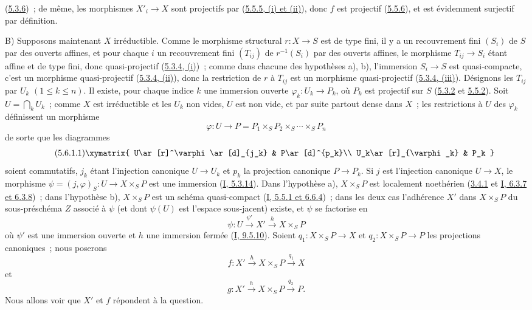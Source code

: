
(\hyperref[II.5.3.6-fr]{5.3.6})~; de même, les morphismes $X'_i\to X$ sont
projectifs par (\hyperref[II.5.5.5-fr]{5.5.5, (i) et (ii)}), donc $f$ est
projectif (\hyperref[II.5.5.6-fr]{5.5.6}), et est évidemment surjectif par
définition.

B) Supposons maintenant $X$ irréductible. Comme le morphisme structural
$r:X\to S$ est de type fini, il y a un recouvrement fini $(S_i)$ de $S$ par
des ouverts affines, et pour chaque $i$ un recouvrement fini $(T_{ij})$ de
$r^{-1}(S_i)$ par des ouverts affines, le morphisme $T_{ij}\to S_i$ étant
affine et de type fini, donc quasi-projectif
(\hyperref[II.5.3.4-fr]{5.3.4, (i)})~; comme dans chacune des hypothèses a),
b), l'immersion $S_i\to S$ est quasi-compacte, c'est un morphisme
quasi-projectif (\hyperref[II.5.3.4-fr]{5.3.4, (ii)}), donc la restriction de
$r$ à $T_{ij}$ est un morphisme quasi-projectif
(\hyperref[II.5.3.4-fr]{5.3.4, (iii)}). Désignons les $T_{ij}$ par $U_k$
$(1\leq k\leq n)$. Il existe, pour chaque indice $k$ une immersion ouverte
$\varphi_k:U_k\to P_k$, où $P_k$ est projectif sur $S$
(\hyperref[II.5.3.2-fr]{5.3.2} et \hyperref[II.5.5.2-fr]{5.5.2}). Soit
$U=\bigcap_kU_k$~; comme $X$ est irréductible et les $U_k$ non vides, $U$ est
non vide, et par suite partout dense dans $X$~; les restrictions à $U$ des
$\varphi_k$ définissent un morphisme
\[
\varphi:U\to P=P_1\times_SP_2\times_S\cdots\times_SP_n
\]
de sorte que les diagrammes
\[
\tag{5.6.1.1}
\label{II.5.6.1.1-fr}
\xymatrix{
U\ar[r]^\varphi\ar[d]_{j_k} & P\ar[d]^{p_k}\\
U_k\ar[r]_{\varphi_k} & P_k
}
\]
soient commutatifs, $j_k$ étant l'injection canonique $U\to U_k$ et $p_k$ la
projection canonique $P\to P_k$. Si $j$ est l'injection canonique $U\to X$,
le morphisme $\psi=(j,\varphi)_S:U\to X\times_SP$ est une immersion
(\hyperref[I.5.3.14-fr]{I, 5.3.14}). Dans l'hypothèse a), $X\times_SP$ est
localement noethérien (\hyperref[II.3.4.1-fr]{3.4.1} et
\hyperref[I.6.3.7-fr]{I, 6.3.7 et 6.3.8})~; dans l'hypothèse b),
$X\times_SP$ est un schéma quasi-compact
(\hyperref[I.5.5.1-fr]{I, 5.5.1 et 6.6.4})~; dans les deux cas l'adhérence
$X'$ dans $X\times_SP$ du sous-préschéma $Z$ associé à $\psi$ (et dont
$\psi(U)$ est l'espace sous-jacent) existe, et $\psi$ se factorise en
\[
\tag{5.6.1.2}
\label{II.5.6.1.2-fr}
\psi:U\xrightarrow{\psi'}X'\xrightarrow{h}X\times_SP
\]
où $\psi'$ est une immersion ouverte et $h$ une immersion fermée
(\hyperref[I.9.5.10-fr]{I, 9.5.10}). Soient
$q_1:X\times_SP\to X$ et $q_2:X\times_SP\to P$ les projections canoniques~;
nous poserons
\[
\tag{5.6.1.3}
\label{II.5.6.1.3-fr}
f:X'\xrightarrow{h}X\times_SP\xrightarrow{q_1}X
\]
et
\[
\tag{5.6.1.4}
\label{II.5.6.1.4-fr}
g:X'\xrightarrow{h}X\times_SP\xrightarrow{q_2}P.
\]
Nous allons voir que $X'$ et $f$ répondent à la question.

